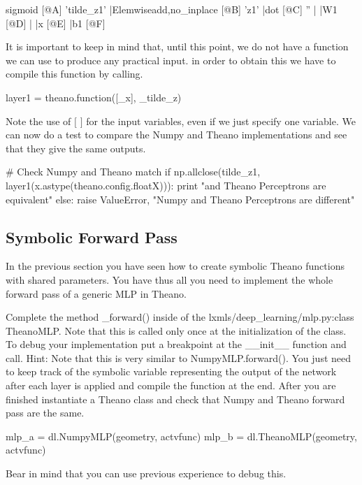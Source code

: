 \begin{exercise}
\begin{python}
sigmoid [@A] 'tilde_z1'
 |Elemwise{add,no_inplace} [@B] 'z1'
   |dot [@C] ''
   | |W1 [@D]
   | |x [@E]
   |b1 [@F]

\end{python}
It is important to keep in mind that, until this point, we do not have a
function we can use to produce any practical input. in order to obtain this we
have to compile this function by calling.    
\begin{python}
layer1 = theano.function([_x], _tilde_z)
\end{python}
Note the use of $[$ $]$ for the input variables, even if we just specify one
variable. We can now do a test to compare the Numpy and Theano implementations
and see that they give the same outputs.
\begin{python}
# Check Numpy and Theano match
if np.allclose(tilde_z1, layer1(x.astype(theano.config.floatX))):
    print "\nNumpy and Theano Perceptrons are equivalent"
else:
    raise ValueError, "Numpy and Theano Perceptrons are different"
\end{python}
\end{exercise}

\subsection{Symbolic Forward Pass}
In the previous section you have seen how to create symbolic Theano functions
with shared parameters. You have thus all you need to implement the whole
forward pass of a generic MLP in Theano.
\begin{exercise}
Complete the method \_forward() inside of the lxmls/deep\_learning/mlp.py:class
TheanoMLP. Note that this is called only once at the initialization of the
class. To debug your implementation put a breakpoint at the \_\_init\_\_
function and call. Hint: Note that this is very similar to NumpyMLP.forward().
You just need to keep track of the symbolic variable representing the output of
the network after each layer is applied and compile the function at the end.
After you are finished instantiate a Theano class and check that Numpy and
Theano forward pass are the same. 

\begin{python}
mlp_a = dl.NumpyMLP(geometry, actvfunc)
mlp_b = dl.TheanoMLP(geometry, actvfunc)
\end{python}

Bear in mind that you can use previous experience to debug this.

\end{exercise}

